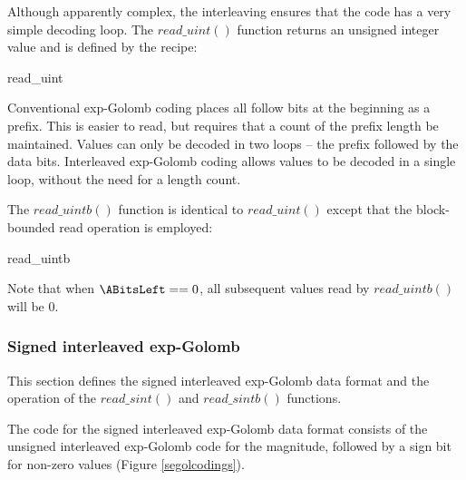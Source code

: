 Although apparently complex, the interleaving ensures that the code has a very simple decoding loop. 
The $read\_uint()$ function returns an unsigned integer value and is defined by the recipe:

\begin{pseudo}{read\_uint}{}
  \bsEND
\bsEND
{}
\end{pseudo}

\begin{informative}
Conventional exp-Golomb coding places all follow bits at the beginning as a prefix. This is
easier to read, but requires that a count of the prefix length be maintained. Values can only
be decoded in two loops -- the prefix followed by the data bits. Interleaved exp-Golomb 
coding allows values to be decoded in a single loop, without the need for a length count.
\end{informative}

The $read\_uintb()$ function is identical to $read\_uint()$ except that the block-bounded read
operation is employed:

\begin{pseudo}{read\_uintb}{}
  \bsEND
\bsEND
{}
\end{pseudo}

Note that when $\ABitsLeft==0$, all subsequent values read by $read\_uintb()$ will be 0.

\subsubsection{Signed interleaved exp-Golomb}
\label{segol}

This section defines the signed interleaved exp-Golomb data format and the operation
of the $read\_sint()$ and $read\_sintb()$ functions.

The code for the signed interleaved exp-Golomb data format consists of the
unsigned interleaved exp-Golomb code for the magnitude, followed by a sign bit
for non-zero values (Figure \ref{segolcodings}).


